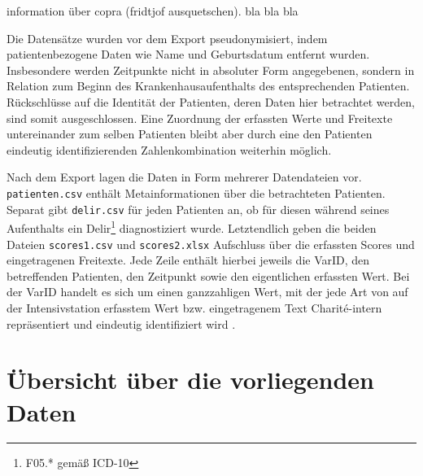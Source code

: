 information über copra (fridtjof ausquetschen). bla bla bla

Die Datensätze wurden vor dem Export pseudonymisiert, indem patientenbezogene Daten wie Name und Geburtsdatum entfernt wurden. Insbesondere werden Zeitpunkte nicht in absoluter Form angegebenen, sondern in Relation zum Beginn des Krankenhausaufenthalts des entsprechenden Patienten. Rückschlüsse auf die Identität der Patienten, deren Daten hier betrachtet werden, sind somit ausgeschlossen. Eine Zuordnung der erfassten Werte und Freitexte untereinander zum selben Patienten bleibt aber durch eine den Patienten eindeutig identifizierenden Zahlenkombination weiterhin möglich.

Nach dem Export lagen die Daten in Form mehrerer Datendateien vor. \texttt{patienten.csv} enthält Metainformationen über die betrachteten Patienten. Separat gibt \texttt{delir.csv} für jeden Patienten an, ob für diesen während seines Aufenthalts ein Delir\footnote{F05.* gemäß ICD-10} diagnostiziert wurde. Letztendlich geben die beiden Dateien \texttt{scores1.csv} und \texttt{scores2.xlsx} Aufschluss über die erfassten Scores und eingetragenen Freitexte. Jede Zeile enthält hierbei jeweils die VarID, den betreffenden Patienten, den Zeitpunkt sowie den eigentlichen erfassten Wert. Bei der VarID handelt es sich um einen ganzzahligen Wert, mit der jede Art von auf der Intensivstation erfasstem Wert bzw. eingetragenem Text Charité-intern repräsentiert und eindeutig identifiziert wird .

\section{Übersicht über die vorliegenden Daten} \label{section:vorliegende_daten}

